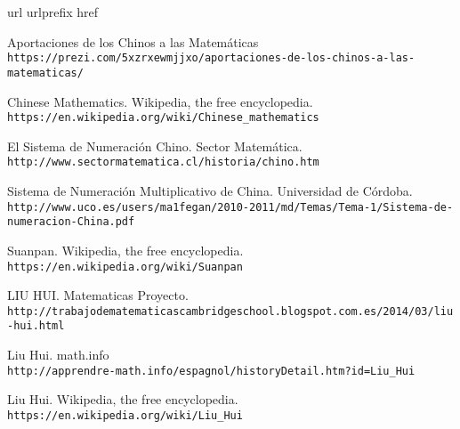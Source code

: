 \begin{thebibliography}{10}
\expandafter\ifx\csname url\endcsname\relax
  \def\url#1{\texttt{#1}}\fi
\expandafter\ifx\csname urlprefix\endcsname\relax\def\urlprefix{URL }\fi
\expandafter\ifx\csname href\endcsname\relax
  \def\href#1#2{#2} \def\path#1{#1}\fi

Aportaciones de los Chinos a las Matemáticas\\
  \url{https://prezi.com/5xzrxewmjjxo/aportaciones-de-los-chinos-a-las-matematicas/}

Chinese Mathematics. Wikipedia, the free encyclopedia.\\
  \url{https://en.wikipedia.org/wiki/Chinese_mathematics}

El Sistema de Numeración Chino. Sector Matemática.\\
  \url{http://www.sectormatematica.cl/historia/chino.htm}

Sistema de Numeración Multiplicativo de China. Universidad de Córdoba.\\
  \url{http://www.uco.es/users/ma1fegan/2010-2011/md/Temas/Tema-1/Sistema-de-numeracion-China.pdf}

Suanpan. Wikipedia, the free encyclopedia.\\
  \url{https://en.wikipedia.org/wiki/Suanpan}
  
LIU HUI. Matematicas Proyecto.\\
  \url{http://trabajodematematicascambridgeschool.blogspot.com.es/2014/03/liu-hui.html}

Liu Hui. math.info\\
  \url{http://apprendre-math.info/espagnol/historyDetail.htm?id=Liu_Hui}
  
Liu Hui. Wikipedia, the free encyclopedia.\\
  \url{https://en.wikipedia.org/wiki/Liu_Hui}

\end{thebibliography}
